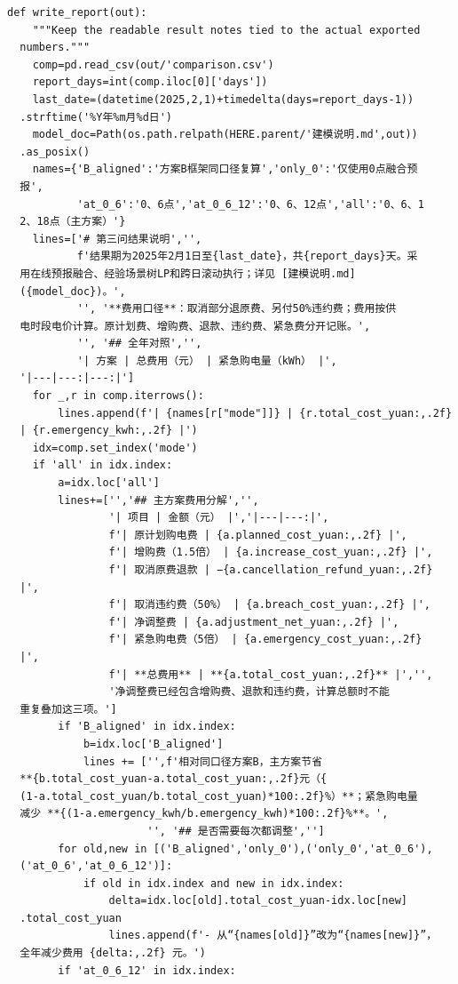 \begin{verbatim}
def write_report(out):
    """Keep the readable result notes tied to the actual exported
  numbers."""
    comp=pd.read_csv(out/'comparison.csv')
    report_days=int(comp.iloc[0]['days'])
    last_date=(datetime(2025,2,1)+timedelta(days=report_days-1))
  .strftime('%Y年%m月%d日')
    model_doc=Path(os.path.relpath(HERE.parent/'建模说明.md',out))
  .as_posix()
    names={'B_aligned':'方案B框架同口径复算','only_0':'仅使用0点融合预
  报',
           'at_0_6':'0、6点','at_0_6_12':'0、6、12点','all':'0、6、1
  2、18点（主方案）'}
    lines=['# 第三问结果说明','',
           f'结果期为2025年2月1日至{last_date}，共{report_days}天。采
  用在线预报融合、经验场景树LP和跨日滚动执行；详见 [建模说明.md]
  ({model_doc})。',
           '', '**费用口径**：取消部分退原费、另付50%违约费；费用按供
  电时段电价计算。原计划费、增购费、退款、违约费、紧急费分开记账。',
           '', '## 全年对照','',
           '| 方案 | 总费用（元） | 紧急购电量（kWh） |',
  '|---|---:|---:|']
    for _,r in comp.iterrows():
        lines.append(f'| {names[r["mode"]]} | {r.total_cost_yuan:,.2f}
  | {r.emergency_kwh:,.2f} |')
    idx=comp.set_index('mode')
    if 'all' in idx.index:
        a=idx.loc['all']
        lines+=['','## 主方案费用分解','',
                '| 项目 | 金额（元） |','|---|---:|',
                f'| 原计划购电费 | {a.planned_cost_yuan:,.2f} |',
                f'| 增购费（1.5倍） | {a.increase_cost_yuan:,.2f} |',
                f'| 取消原费退款 | −{a.cancellation_refund_yuan:,.2f}
  |',
                f'| 取消违约费（50%） | {a.breach_cost_yuan:,.2f} |',
                f'| 净调整费 | {a.adjustment_net_yuan:,.2f} |',
                f'| 紧急购电费（5倍） | {a.emergency_cost_yuan:,.2f}
  |',
                f'| **总费用** | **{a.total_cost_yuan:,.2f}** |','',
                '净调整费已经包含增购费、退款和违约费，计算总额时不能
  重复叠加这三项。']
        if 'B_aligned' in idx.index:
            b=idx.loc['B_aligned']
            lines += ['',f'相对同口径方案B，主方案节省
  **{b.total_cost_yuan-a.total_cost_yuan:,.2f}元（{
  (1-a.total_cost_yuan/b.total_cost_yuan)*100:.2f}%）**；紧急购电量
  减少 **{(1-a.emergency_kwh/b.emergency_kwh)*100:.2f}%**。',
                      '', '## 是否需要每次都调整','']
        for old,new in [('B_aligned','only_0'),('only_0','at_0_6'),
  ('at_0_6','at_0_6_12')]:
            if old in idx.index and new in idx.index:
                delta=idx.loc[old].total_cost_yuan-idx.loc[new]
  .total_cost_yuan
                lines.append(f'- 从“{names[old]}”改为“{names[new]}”，
  全年减少费用 {delta:,.2f} 元。')
        if 'at_0_6_12' in idx.index:

\end{verbatim}
